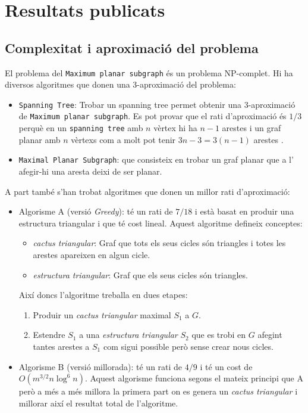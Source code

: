 \documentclass[a4paper]{article}
\begin{document}
\section{Resultats publicats}

\subsection{Complexitat i aproximació del problema}
El problema del \texttt{Maximum planar subgraph} és un problema NP-complet. Hi ha diversos algoritmes que donen una 3-aproximació del problema\cite{betterApproximation}:
\begin{itemize}
	\item \texttt{Spanning Tree}: Trobar un spanning tree permet obtenir una 3-aproximació de \texttt{Maximum planar subgraph}. Es pot provar que el rati d'aproximació és $1/3$ perquè en un \texttt{spanning tree} amb $n$ vèrtex hi ha $n - 1$ arestes i un graf planar amb $n$ vèrtexs com a molt pot tenir $3n - 3 = 3(n - 1)$ arestes \cite{planar}.
	\item \texttt{Maximal Planar Subgraph}: que consisteix en trobar un graf planar que a l' afegir-hi una aresta deixi de ser planar.	
\end{itemize}

A part també s'han trobat algoritmes que donen un millor rati d'aproximació:
\begin{itemize}
	\item Algorisme A (versió \emph{Greedy}): té un rati de $7/18$ i està basat en produir una estructura triangular i que té cost lineal. Aquest algoritme defineix conceptes:
	\begin{itemize}
		\item \emph{cactus triangular}: Graf que tots els seus cicles són triangles i totes les arestes apareixen en algun cicle.
		\item \emph{estructura triangular}: Graf que els seus cicles són triangles.
	\end{itemize}
	Així doncs l'algoritme treballa en dues etapes:
	\begin{enumerate}
		\item Produir un \emph{cactus triangular} maximal $S_1$ a $G$.
		\item Estendre $S_1$ a una \emph{estructura triangular} $S_2$ que es trobi en $G$ afegint tantes arestes a $S_1$ com sigui possible però sense crear nous cicles.
	\end{enumerate}
	\item Algorisme B (versió millorada): té un rati de $4/9$ i té un cost de $O(m^{3/2}n\log^6 n)$. Aquest algorisme funciona segons el mateix principi que A però a més a més millora la primera part on es genera un \emph{cactus triangular} i millorar així el resultat total de l'algoritme. 
\end{itemize}

\printbibliography
\end{document}
